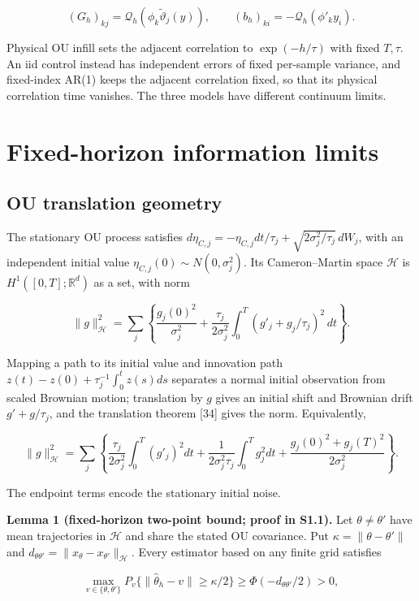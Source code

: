 \documentclass[ejs]{imsart}
\begin{document}
\[
(G_h)_{kj}=\mathcal Q_h(\phi_k\widetilde\vartheta_j(y)),\qquad
(b_h)_{ki}=-\mathcal Q_h(\phi'_ky_i).
\]

Physical OU infill sets the adjacent correlation to \(\exp(-h/\tau)\)
with fixed \(T,\tau\). An iid control instead has independent errors of
fixed per-sample variance, and fixed-index AR(1) keeps the adjacent
correlation fixed, so that its physical correlation time vanishes. The
three models have different continuum limits.

\section{Fixed-horizon information
limits}\label{fixed-horizon-information-limits}

\subsection{OU translation
geometry}\label{ou-translation-geometry}

The stationary OU process satisfies
\(d\eta_{C,j}=-\eta_{C,j}dt/\tau_j+\sqrt{2\sigma_j^2/\tau_j}\,dW_j\),
with an independent initial value \(\eta_{C,j}(0)\sim N(0,\sigma_j^2)\).
Its Cameron--Martin space \(\mathcal H\) is \(H^1([0,T];\mathbb R^d)\)
as a set, with norm

\[
\|g\|_{\mathcal H}^2=\sum_j\left\{\frac{g_j(0)^2}{\sigma_j^2}+
\frac{\tau_j}{2\sigma_j^2}\int_0^T(g'_j+g_j/\tau_j)^2\,dt\right\}.
\]

Mapping a path to its initial value and innovation path
\(z(t)-z(0)+\tau_j^{-1}\int_0^tz(s)ds\) separates a normal initial
observation from scaled Brownian motion; translation by \(g\) gives an
initial shift and Brownian drift \(g'+g/\tau_j\), and the translation
theorem {[}34{]} gives the norm. Equivalently,

\[
\|g\|_{\mathcal H}^2=\sum_j\left\{\frac{\tau_j}{2\sigma_j^2}\int_0^T(g'_j)^2dt+
\frac1{2\sigma_j^2\tau_j}\int_0^Tg_j^2dt+
\frac{g_j(0)^2+g_j(T)^2}{2\sigma_j^2}\right\}.
\]

The endpoint terms encode the stationary initial noise.

\textbf{Lemma 1 (fixed-horizon two-point bound; proof in S1.1).} Let
\(\theta\ne\theta'\) have mean trajectories in \(\mathcal H\) and share
the stated OU covariance. Put \(\kappa=\|\theta-\theta'\|\) and
\(d_{\theta\theta'}=\|x_\theta-x_{\theta'}\|_{\mathcal H}\). Every
estimator based on any finite grid satisfies

\[
\max_{v\in\{\theta,\theta'\}}P_v\{\|\widehat\theta_h-v\|\geq\kappa/2\}
\geq\Phi(-d_{\theta\theta'}/2)>0,
\]
\end{document}
